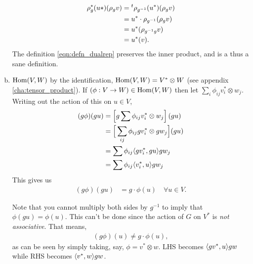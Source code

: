 \begin{enumerate}[(a)]
\begin{align*}
            \rho_g^*(u*)(\rho_g v) &= \prescript{t}{}\rho_{g^{-1}}(u^*)(\rho_g v)\\
                &= u^*\cdot\rho_{g^{-1}} (\rho_g v) \\
                &= u^* (\rho_{g^{-1}g} v) \\
                &= u^*(v).
        \end{align*}
        The definition \eqref{eqn:defn_dualrep} preserves the inner product, and is a thus a sane definition.
    \item $\operatorname{Hom}(V,W)$ by the identification, $\operatorname{Hom}(V,W)=V^*\otimes W$ (see appendix \ref{cha:tensor_product}). If $(\phi: V\to W)\in \operatorname{Hom}(V,W)$ then let $\sum_i \phi_{ij} v_i^*\otimes w_j$. Writing out the action of this on $u\in V$,
        \begin{align*}
            (g\phi)(gu) &= \left[ g \sum\phi_{ij} v^*_i \otimes w_j \right] (gu) \\
                &= \Big[ \sum_{ij}\phi_{ij} gv^*_i \otimes gw_j \Big] (gu) \\
                &= \sum \phi_{ij} \langle gv_i^*, gu\rangle g w_j\\
                &= \sum \phi_{ij} \langle v_i^*, u\rangle g w_j\\
        \end{align*}
        This gives us
        \begin{align}
            (g\phi)(gu) &= g\cdot\phi(u)\quad \forall u\in  V.
            \label{eqn:linearmap_groupaction}
        \end{align}
        \begin{insight}
            Note that you cannot multiply both sides by $g^{-1}$ to imply that $\phi(gu)=\phi(u)$. This can't be done since the action of $G$ on $V^*$ is \emph{not associative}. That means,
            \begin{align*}
                (g\phi)(u) \neq g\cdot \phi(u),
            \end{align*}
            as can be seen by simply taking, say, $\phi=v^*\otimes w$. LHS becomes $\langle gv^*, u \rangle gw$ while RHS becomes $\langle v^*,w\rangle gw$.
        \end{insight}
        \begin{center}
\end{center}
\end{enumerate}
